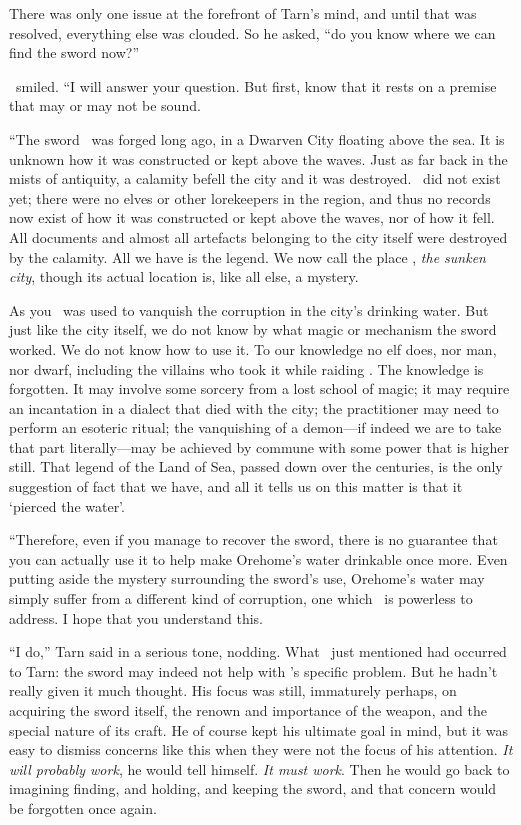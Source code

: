 There was only one issue at the forefront of Tarn's mind, and until that was resolved, everything else was clouded.  So he asked, ``do you know where we can find the sword now?''

\arilor\ smiled.  ``I will answer your question.  But first, know that it rests on a premise that may or may not be sound.

``The sword \kildir\ was forged long ago, in a Dwarven City floating above the sea.  It is unknown how it was constructed or kept above the waves.  Just as far back in the mists of antiquity, a calamity befell the city and it was destroyed.  \inarthonor\ did not exist yet; there were no elves or other lorekeepers in the region, and thus no records now exist of how it was constructed or kept above the waves, nor of how it fell.  All documents and almost all artefacts belonging to the city itself were destroyed by the calamity.  All we have is the legend.  We now call the place \atmudarant, \emph{the sunken city}, though its actual location is, like all else, a mystery.

As you \kildir\ was used to vanquish the corruption in the city's drinking water.  But just like the city itself, we do not know by what magic or mechanism the sword worked.  We do not know how to use it.  To our knowledge no elf does, nor man, nor dwarf, including the villains who took it while raiding \yedmurdim.  The knowledge is forgotten.  It may involve some sorcery from a lost school of magic; it may require an incantation in a dialect that died with the city; the practitioner may need to perform an esoteric ritual; the vanquishing of a demon---if indeed we are to take that part literally---may be achieved by commune with some power that is higher still.  That legend of the Land of Sea, passed down over the centuries, is the only suggestion of fact that we have, and all it tells us on this matter is that it `pierced the water'.

``Therefore, even if you manage to recover the sword, there is no guarantee that you can actually use it to help make Orehome's water drinkable once more.  Even putting aside the mystery surrounding the sword's use, Orehome's water may simply suffer from a different kind of corruption, one which \kildir\ is powerless to address.  I hope that you understand this.

``I do,'' Tarn said in a serious tone, nodding.  What \arilor\ just mentioned had occurred to Tarn: the sword may indeed not help with \korbarthrond's specific problem.  But he hadn't really given it much thought.  His focus was still, immaturely perhaps, on acquiring the sword itself, the renown and importance of the weapon, and the special nature of its craft.  He of course kept his ultimate goal in mind, but it was easy to dismiss concerns like this when they were not the focus of his attention.  \emph{It will probably work}, he would tell himself.  \emph{It must work}.  Then he would go back to imagining finding, and holding, and keeping the sword, and that concern would be forgotten once again.

